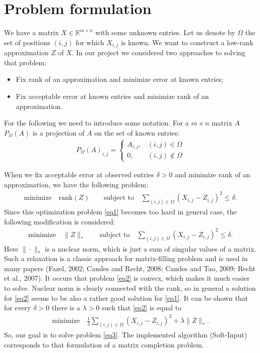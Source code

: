 \documentclass[12pt]{article}
\begin{document}
\section{Problem formulation}

We have a matrix $X \in \mathbb{R}^{m \times n}$ with some unknown entries. Let us denote by $\Omega$ the set of positions $(i, j)$ for which $X_{i,j}$ is known. We want to construct a low-rank approximation $Z$ of $X$. In our project we considered two approaches to solving that problem:
\begin{itemize}
\item Fix rank of an approximation and minimize error at known entries;
\item Fix acceptable error at known entries and minimize rank of an approximation.
\end{itemize}

For the following we need to introduce some notation. For a $m \times n$ matrix $A$ $P_{\Omega}(A)$ is a projection of $A$ on the set of known entries:
\begin{align*}
P_{\Omega}(A)_{i,j} = \begin{cases}
A_{i, j}, & (i, j) \in \Omega \\
0, & (i, j) \not\in \Omega
\end{cases}
\end{align*}

When we fix acceptable error at observed entries $\delta > 0$ and minimize rank of an approximation, we have the following problem:
\begin{align}\label{eq1}
\text{minimize} \quad \text{rank}(Z) \qquad \text{subject to} \quad \sum \limits_{(i, j) \in \Omega} (X_{i, j} - Z_{i, j})^2 \leq \delta.
\end{align}
Since this optimization problem \ref{eq1} becomes too hard in general case, the following modification is considered:
\begin{align}\label{eq2}
\text{minimize} \quad \| Z \|_{\ast} \qquad \text{subject to} \quad \sum \limits_{(i, j) \in \Omega} (X_{i, j} - Z_{i, j})^2 \leq \delta.
\end{align}
Here $\| \cdot \|_{\ast}$ is a nuclear norm, which is just a sum of singular values of a matrix. Such a relaxation is a classic approach for matrix-filling problem and is used in many papers (Fazel, 2002; Candes and Recht, 2008; Candes and Tao, 2009; Recht et al., 2007). It occurs that problem \ref{eq2} is convex, which makes it much easier to solve. Nuclear norm is clearly connected with the rank, so in general a solution for \ref{eq2} seems to be also a rather good solution for \ref{eq1}. It can be shown that for every $\delta > 0$ there is a $\lambda > 0$ such that \ref{eq2} is equal to  
\begin{align}\label{eq3}
\text{minimize} \quad \frac{1}{2} \sum \limits_{(i, j) \in \Omega} (X_{i, j} - Z_{i, j})^2 + \lambda \| Z \|_{\ast}.
\end{align}
So, our goal is to solve problem \ref{eq3}. The implemented algorithm (Soft-Input) corresponds to that formulation of a matrix completion problem.
\end{document}
